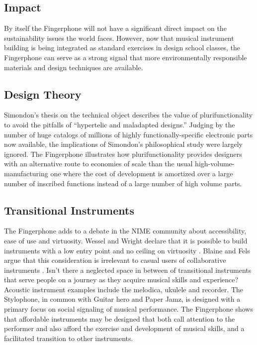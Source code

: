 \subsection{Impact}

By itself the Fingerphone will not have a significant direct impact on the
sustainability issues the world faces. However, now that musical instrument
building is being integrated as standard exercises in design school classes, the
Fingerphone can serve as a strong signal that more environmentally responsible
materials and design techniques are available.

\subsection{Design Theory}

Simondon's thesis on the technical object \cite{Simondon:1958} describes the value  of
plurifunctionality to avoid  the pitfalls of ``hypertelic and maladapted
designs.'' Judging by the number of huge catalogs of millions of highly
functionally-specific electronic parts now available, the implications of
Simondon's philosophical study were largely ignored. The Fingerphone illustrates
how plurifunctionality provides designers with an alternative route to economies
of scale than the usual high-volume-manufacturing one where the cost of
development is amortized over a large number of inscribed functions instead of a
large number of high volume parts.

\subsection{Transitional Instruments}

The Fingerphone adds to a debate in the NIME community about accessibility, ease
of use and virtuosity. Wessel and Wright declare that it is possible to build
instruments with a low entry point and no ceiling on virtuosity \cite{Wessel:2002}. Blaine and
Fels argue that this consideration is irrelevant to casual users of collaborative
instruments \cite{Blaine:2003}. Isn't there a neglected space in between of transitional
instruments that serve people on a journey as they acquire musical skills and
experience?  Acoustic instrument examples include the melodica, ukulele and
recorder. The Stylophone, in common with Guitar hero and Paper Jamz, is designed
with a primary focus on social signaling of musical performance. The Fingerphone
shows that affordable instruments may be designed that both call attention to the
performer and also afford the exercise and development of musical skills, and a
facilitated transition to other instruments.

